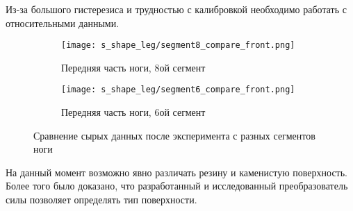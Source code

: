 Из-за большого гистерезиса и трудностью с калибровкой необходимо работать с относительными данными.

\begin{figure}[H]
    \begin{subfigure}{0.49\textwidth}
        \centering\texttt{[image: s\_shape\_leg/segment8\_compare\_front.png]}
        \caption{Передняя часть ноги, 8ой сегмент}
    \end{subfigure}
    \begin{subfigure}{0.49\textwidth}
        \centering\texttt{[image: s\_shape\_leg/segment6\_compare\_front.png]}
        \caption{Передняя часть ноги, 6ой сегмент}
    \end{subfigure}
    \caption{Сравнение сырых данных после эксперимента с разных сегментов ноги}
    \label{fig:data_from_legs}
\end{figure}

На данный момент возможно явно различать резину и каменистую поверхность. Более того было доказано, что разработанный и исследованный преобразователь силы позволяет определять тип поверхности.